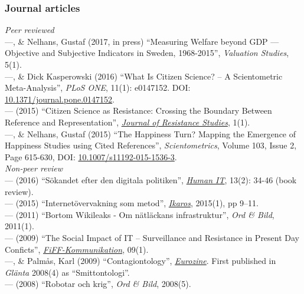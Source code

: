 \documentclass[a4paper,11pt,oneside]{article}
\begin{document}
\subsubsection{Journal articles}
  \noindent  \emph{Peer reviewed} \\
  ---, \& Nelhans, Gustaf (2017, in press) ``Measuring Welfare beyond GDP --- Objective and Subjective Indicators in Sweden, 1968-2015'', \emph{Valuation Studies}, 5(1).\\
  ---, \& Dick Kasperowski (2016) ``What Is Citizen Science? – A Scientometric Meta-Analysis'', \emph{PLoS ONE}, 11(1): e0147152. DOI: \href{http://dx.doi.org/10.1371/journal.pone.0147152}{10.1371/journal.pone.0147152}.\\
  --- (2015) ``Citizen Science as Resistance: Crossing the Boundary Between Reference and Representation'', \href{https://gup.ub.gu.se/publication/218601-citizen-science-as-resistance-crossing-the-boundary-between-reference-and-representation}{\emph{Journal of Resistance Studies}}, 1(1).\\
  ---, \& Nelhans, Gustaf (2015) ``The Happiness Turn? Mapping the Emergence of Happiness Studies using Cited References'', \emph{Scientometrics}, Volume 103, Issue 2, Page 615-630, DOI: \href{http://dx.doi.org/10.1007/s11192-015-1536-3}{10.1007/s11192-015-1536-3}.\\

  \noindent  \emph{Non-peer review} \\
    --- (2016) ``Sökandet efter den digitala politiken'', \href{https://humanit.hb.se/article/view/504/572}{\emph{Human IT}}, 13(2): 34-46 (book review).\\
    --- (2015) ``Internetövervakning som metod'', \href{http://gup.ub.gu.se/records/fulltext/220443/220443.pdf}{\emph{Ikaros}}, 2015(1), pp 9–11.\\
    --- (2011) ``Bortom Wikileaks - Om nätläckans infrastruktur'', \emph{Ord \& Bild}, 2011(1).\\
    --- (2009) ``The Social Impact of IT – Surveillance and Resistance in Present Day Conficts'', \href{http://www.fiff.de/publikationen/fiff-kommunikation/fk-2009/fiff-ko-1-2009/fiko_1_2009_kullenberg.pdf}{\emph{FiFF-Kommunikation}}, 09(1).\\
    ---, \& Palmås, Karl (2009) ``Contagiontology'', \href{http://www.eurozine.com/articles/2009-03-09-kullenberg-en.html}{\emph{Eurozine}}. First published in \emph{Glänta} 2008(4) as ``Smittontologi''.\\
    --- (2008) ``Robotar och krig'', \emph{Ord \& Bild}, 2008(5).\\
\end{document}
